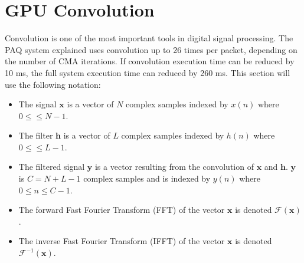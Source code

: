 \section{GPU Convolution}
\label{chap:gpu_convolution}
Convolution is one of the most important tools in digital signal processing.
The PAQ system explained uses convolution up to 26 times per packet, depending on the number of CMA iterations.
If convolution execution time can be reduced by 10 ms, the full system execution time can reduced by 260 ms.
This section will use the following notation: 
\begin{itemize}
\item The signal $\mathbf{x}$ is a vector of $N$ complex samples indexed by $x(n)$ where $0 \leq \leq N-1$.
\item The filter $\mathbf{h}$ is a vector of $L$ complex samples indexed by $h(n)$ where $0 \leq \leq L-1$.
\item The filtered signal $\mathbf{y}$ is a vector resulting from the convolution of $\mathbf{x}$ and $\mathbf{h}$. $\mathbf{y}$ is $C = N + L -1$ complex samples and is indexed by $y(n)$ where $0 \leq n \leq C-1$.
\item The forward Fast Fourier Transform (FFT) of the vector $\mathbf{x}$ is denoted $\mathscr{F}(\mathbf{x})$.
\item The inverse Fast Fourier Transform (IFFT) of the vector $\mathbf{x}$ is denoted $\mathscr{F}^{-1}(\mathbf{x})$.
\end{itemize}

